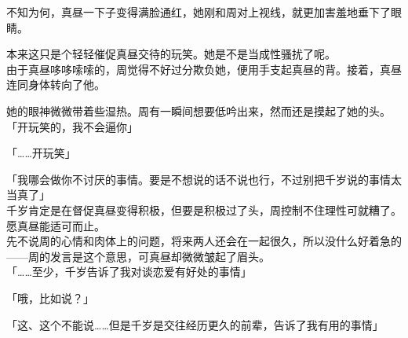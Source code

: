 不知为何，真昼一下子变得满脸通红，她刚和周对上视线，就更加害羞地垂下了眼睛。

本来这只是个轻轻催促真昼交待的玩笑。她是不是当成性骚扰了呢。\\

由于真昼哆哆嗦嗦的，周觉得不好过分欺负她，便用手支起真昼的背。接着，真昼连同身体转向了他。

她的眼神微微带着些湿热。周有一瞬间想要低吟出来，然而还是摸起了她的头。\\

「开玩笑的，我不会逼你」

「……开玩笑」

「我哪会做你不讨厌的事情。要是不想说的话不说也行，不过别把千岁说的事情太当真了」\\

千岁肯定是在督促真昼变得积极，但要是积极过了头，周控制不住理性可就糟了。愿真昼能适可而止。\\

先不说周的心情和肉体上的问题，将来两人还会在一起很久，所以没什么好着急的——周的发言是这个意思，可真昼却微微皱起了眉头。\\

「……至少，千岁告诉了我对谈恋爱有好处的事情」

「哦，比如说？」

「这、这个不能说……但是千岁是交往经历更久的前辈，告诉了我有用的事情」


